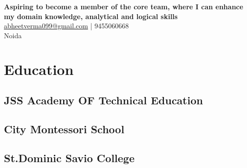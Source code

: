 \documentclass[]{resume-openfont}
\begin{document}
%
%
\lastupdated

%
%


{
\textbf{Aspiring to become a member of the core team, where I can enhance my domain knowledge, analytical and logical skills}
 \\
\href{mailto:abheetverma099@gmail.com}{abheetverma099@gmail.com} | 9455060668\\Noida
}

%
%

\begin{minipage}[t]{0.33\textwidth} 


\section{Education} 

\subsection{JSS Academy OF Technical Education}
\sectionsep



\subsection{City Montessori School}
\sectionsep

\subsection{St.Dominic Savio College}
\sectionsep



\end{minipage}
\end{document}

